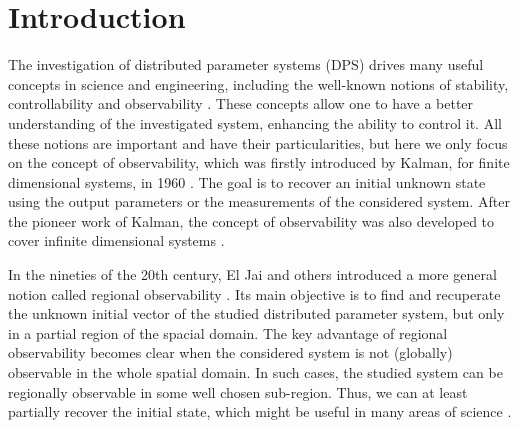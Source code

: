 \documentclass{article}
\begin{document}

\section{Introduction}

The investigation of distributed parameter systems (DPS) drives 
many useful concepts in science and engineering, including the 
well-known notions of stability, controllability and observability
\cite{curtain.1978,zwart.1995,eljai.1997,eljai.2012,loins.1997,weiss.2009}. 
These concepts allow one to have a better understanding of the investigated system, 
enhancing the ability to control it. All these notions are important and have their 
particularities, but here we only focus on the concept of observability, 
which was firstly introduced by Kalman, for finite dimensional systems, 
in 1960 \cite{kalman.1960}. The goal is to recover an initial unknown state
using the output parameters or the measurements
of the considered system. After the pioneer work of Kalman, the concept 
of observability was also developed to cover infinite dimensional systems
\cite{magnusson.1984,wang.1982}. 

In the nineties of the 20th century, El Jai and others introduced
a more general notion called regional observability
\cite{amouroux.1994,simon.1993,zerrik.1993}.
Its main objective is to find and recuperate the unknown initial vector 
of the studied distributed parameter system, but only in a partial region 
of the spacial domain. The key advantage of regional observability becomes 
clear when the considered system is not (globally) observable in the 
whole spatial domain. In such cases, the studied system can be regionally 
observable in some well chosen sub-region. Thus, we can at least partially recover 
the initial state, which might be useful in many areas of science \cite{MR4376818}.
\end{document}
